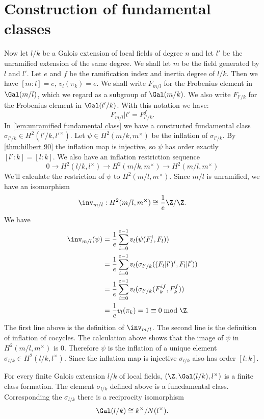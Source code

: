 \section{Construction of fundamental classes}

Now let $l/k$ be a Galois extension of local fields of degree $n$ and let $l'$ be
the unramified extension of the same degree.
We shall let $m$ be the field generated by $l$ and $l'$.
Let $e$ and $f$ be the ramification index and inertia degree of $l/k$.
Then we have $[m:l] = e$, $v_l(\pi_k)= e$.
We shall write $F_{m/l}$ for the Frobenius element in $\Gal(m/l)$, which we regard as a subgroup
of $\Gal(m/k)$. We also write $F_{l'/k}$ for the Frobenius element in $\Gal(l'/k)$.
With this notation we have:
\[
	F_{m/l}|l' = F_{l'/k}^f.
\]
In \ref{lem:unramified fundamental class} we have a constructed fundamental class
$\sigma_{l'/k} \in H^2(l'/k,l'^\times)$.
Let $\psi\in H^2(m/k,m^\times)$ be the inflation of $\sigma_{l'/k}$.
By \ref{thm:hilbert 90} the inflation map is injective,
so $\psi$ has order exactly $[l':k] = [l:k]$.
We also have an inflation restriction sequence
\[
	0 \to H^2(l/k, l^\times) \to H^2(m/k , m^\times) \to H^2(m/l, m^\times)
\]
We'll calculate the restriction of $\psi$ to $H^2(m/l, m^\times)$.
Since $m/l$ is unramified, we have an isomorphism
\[
	\inv_{m/l} : H^2(m/l, m^\times) \cong \frac{1}{e}\Z/ \Z.
\]
We have
\begin{align*}
	\inv_{m/l}(\psi)
	&=\frac{1}{e} \sum_{i=0}^{e-1} v_l (\psi (F_l^i,F_l))\\
	&=\frac{1}{e} \sum_{i=0}^{e-1} v_l (\sigma_{l'/k}((F_l|l')^i,F_l|l'))\\
	&=\frac{1}{e} \sum_{i=0}^{e-1} v_l (\sigma_{l'/k}(F_k^{if},F_k^f))\\
	&=\frac{1}{e} v_l (\pi_k) = 1 \equiv 0 \bmod \Z.
\end{align*}
The first line above is the definition of $\inv_{m/l}$.
The second line is the definition of inflation of cocycles.
The calculation above shows that the image of $\psi$ in $H^2(m/l, m^\times)$ is $0$.
Therefore $\psi$ is the inflation of a unique element $\sigma_{l/k} \in H^2(l/k,l^\times)$.
Since the inflation map is injective $\sigma_{l/k}$ also has order $[l:k]$.

\begin{theorem} \label{thm:local fund class}
	For every finite Galois extension $l/k$ of local fields, $(\Z,\Gal(l/k),l^\times)$ is a finite
	class formation. The element $\sigma_{l/k}$ defined above is a funcdamental class.
	Corresponding the $\sigma_{l/k}$ there is a reciprocity isomorphism
	\[
		\Gal(l/k) \cong k^\times / N(l^\times).
	\]
\end{theorem}

